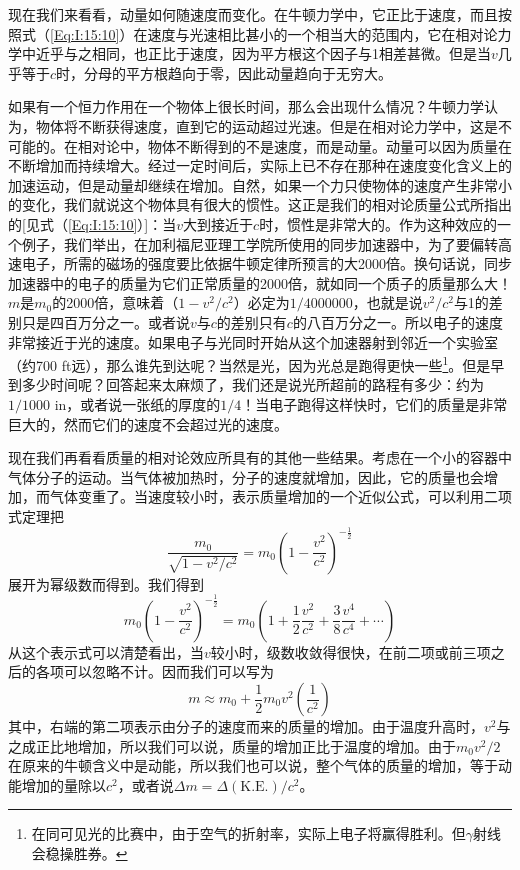 现在我们来看看，动量如何随速度而变化。在牛顿力学中，它正比于速度，而且按照式（\ref{Eq:I:15:10}）在速度与光速相比甚小的一个相当大的范围内，它在相对论力学中近乎与之相同，也正比于速度，因为平方根这个因子与1相差甚微。但是当$v$几乎等于$c$时，分母的平方根趋向于零，因此动量趋向于无穷大。

如果有一个恒力作用在一个物体上很长时间，那么会出现什么情况？牛顿力学认为，物体将不断获得速度，直到它的运动超过光速。但是在相对论力学中，这是不可能的。在相对论中，物体不断得到的不是速度，而是动量。动量可以因为质量在不断增加而持续增大。经过一定时间后，实际上已不存在那种在速度变化含义上的加速运动，但是动量却继续在增加。自然，如果一个力只使物体的速度产生非常小的变化，我们就说这个物体具有很大的惯性。这正是我们的相对论质量公式所指出的[见式（\ref{Eq:I:15:10}）]：当$v$大到接近于$c$时，惯性是非常大的。作为这种效应的一个例子，我们举出，在加利福尼亚理工学院所使用的同步加速器中，为了要偏转高速电子，所需的磁场的强度要比依据牛顿定律所预言的大2000倍。换句话说，同步加速器中的电子的质量为它们正常质量的2000倍，就如同一个质子的质量那么大！ $m$是$m_0$的2000倍，意味着（$1-v^2/c^2$）必定为$1/4000000$，也就是说$v^2/c^2$与1的差别只是四百万分之一。或者说$v$与$c$的差别只有$c$的八百万分之一。所以电子的速度非常接近于光的速度。如果电子与光同时开始从这个加速器射到邻近一个实验室（约700 ft远），那么谁先到达呢？当然是光，因为光总是跑得更快一些\footnote{在同可见光的比赛中，由于空气的折射率，实际上电子将赢得胜利。但$\gamma$射线会稳操胜券。}。但是早到多少时间呢？回答起来太麻烦了，我们还是说光所超前的路程有多少：约为$1/1000$ in，或者说一张纸的厚度的$1/4$！当电子跑得这样快时，它们的质量是非常巨大的，然而它们的速度不会超过光的速度。

现在我们再看看质量的相对论效应所具有的其他一些结果。考虑在一个小的容器中气体分子的运动。当气体被加热时，分子的速度就增加，因此，它的质量也会增加，而气体变重了。当速度较小时，表示质量增加的一个近似公式，可以利用二项式定理把
\begin{equation*}
    \frac{m_0}{\sqrt{1-v^2/c^2}}=m_0(1-\frac{v^2}{c^2})^{-\frac{1}{2}}
\end{equation*}
展开为幂级数而得到。我们得到
\begin{equation*}
    m_0(1-\frac{v^2}{c^2})^{-\frac{1}{2}}=m_0(1+\frac{1}{2} \frac{v^2}{c^2}+\frac{3}{8} \frac{v^4}{c^4}+\cdots)
\end{equation*}
从这个表示式可以清楚看出，当$v$较小时，级数收敛得很快，在前二项或前三项之后的各项可以忽略不计。因而我们可以写为
\begin{equation}
    \label{Eq:I:15:11}
    m \approx m_0+\frac{1}{2}m_0v^2(\frac{1}{c^2})
\end{equation}
其中，右端的第二项表示由分子的速度而来的质量的增加。由于温度升高时，$v^2$与之成正比地增加，所以我们可以说，质量的增加正比于温度的增加。由于$m_0v^2/2$在原来的牛顿含义中是动能，所以我们也可以说，整个气体的质量的增加，等于动能增加的量除以$c^2$，或者说$\Delta m = \Delta (\text{K.E.})/c^2$。

